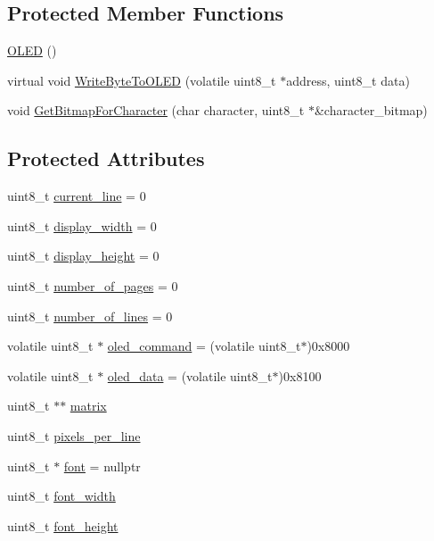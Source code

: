 \subsection*{Protected Member Functions}
\begin{DoxyCompactItemize}
\item 
\hyperlink{class_o_l_e_d_a8eabf371b5642d99800adb759dab27fd}{O\+L\+ED} ()
\item 
virtual void \hyperlink{class_o_l_e_d_a044fdff65656804114d1d39d766099a2}{Write\+Byte\+To\+O\+L\+ED} (volatile uint8\+\_\+t $\ast$address, uint8\+\_\+t data)
\item 
void \hyperlink{class_o_l_e_d_a3bd2f2f05568441e1e0533eaf0db58f8}{Get\+Bitmap\+For\+Character} (char character, uint8\+\_\+t $\ast$\&character\+\_\+bitmap)
\end{DoxyCompactItemize}
\subsection*{Protected Attributes}
\begin{DoxyCompactItemize}
\item 
uint8\+\_\+t \hyperlink{class_o_l_e_d_aebd62601be5e2ceef6295721f17fc013}{current\+\_\+line} = 0
\item 
uint8\+\_\+t \hyperlink{class_o_l_e_d_a2e9305cb3341509bb62d61f33cae76fd}{display\+\_\+width} = 0
\item 
uint8\+\_\+t \hyperlink{class_o_l_e_d_add08b51dec0ffeebcba7902c3bd4aeea}{display\+\_\+height} = 0
\item 
uint8\+\_\+t \hyperlink{class_o_l_e_d_aaac99b0eb4e9dfe92b8571488dc89288}{number\+\_\+of\+\_\+pages} = 0
\item 
uint8\+\_\+t \hyperlink{class_o_l_e_d_a9ea1c55112deede1a61142af276a6bc9}{number\+\_\+of\+\_\+lines} = 0
\item 
volatile uint8\+\_\+t $\ast$ \hyperlink{class_o_l_e_d_af0a85ccd0274347b8c1ac77d298a14cf}{oled\+\_\+command} = (volatile uint8\+\_\+t$\ast$)0x8000
\item 
volatile uint8\+\_\+t $\ast$ \hyperlink{class_o_l_e_d_a1bc54d49808f92ddfc354511b692df6f}{oled\+\_\+data} = (volatile uint8\+\_\+t$\ast$)0x8100
\item 
uint8\+\_\+t $\ast$$\ast$ \hyperlink{class_o_l_e_d_a9d32e21189940afba24deab0a2bc0126}{matrix}
\item 
uint8\+\_\+t \hyperlink{class_o_l_e_d_a6ddac7b826eccac8c682c5246ef52b29}{pixels\+\_\+per\+\_\+line}
\item 
uint8\+\_\+t $\ast$ \hyperlink{class_o_l_e_d_a29ab86a4a73f4d343bf1810927f0911d}{font} = nullptr
\item 
uint8\+\_\+t \hyperlink{class_o_l_e_d_a3c9ea103adf6c860a2534135e9a25ba8}{font\+\_\+width}
\item 
uint8\+\_\+t \hyperlink{class_o_l_e_d_a85b91421932866dea031921799ba83a3}{font\+\_\+height}
\end{DoxyCompactItemize}


